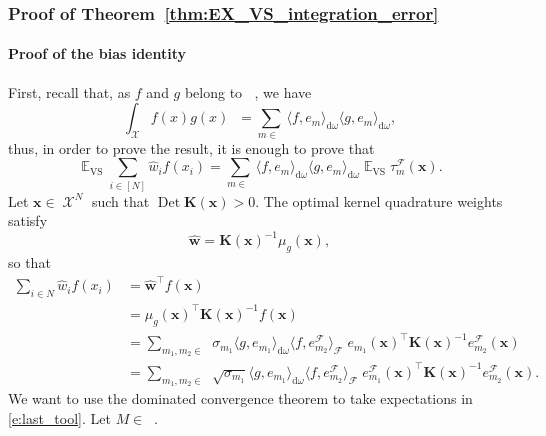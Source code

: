 \documentclass[twoside,11pt]{book}
\numberwithin{theorem}{chapter}
\numberwithin{definition}{chapter}
\numberwithin{proposition}{chapter}
\numberwithin{corollary}{chapter}
\numberwithin{example}{chapter}
\numberwithin{lemma}{chapter}
\DeclareMathOperator{\Det}{Det}
\DeclareMathOperator{\VS}{\mathrm{VS}}
\DeclareMathOperator{\Tran}{\intercal}
\DeclareMathOperator{\EX}{\mathbb{E}}
\DeclareMathOperator{\F}{\mathcal{F}}
\DeclareMathOperator{\X}{\mathcal{X}}
\DeclareMathOperator{\Ltwo}{\mathbb{L}_{2}(\mathrm{d} \omega)}
\DeclareMathOperator{\Mu}{\mathrm{d}\omega(x)}
\DeclareMathOperator{\Ns}{\mathbb{N}^{*}}
\newcommand{\rb}[1]{\textcolor{magenta}{#1}}
\begin{document}
\subsubsection{Proof of Theorem~\ref{thm:EX_VS_integration_error}}\label{app:proof_bias}
\paragraph{Proof of the bias identity}
First, recall that, as $f$ and $g$ belong to $\Ltwo$, we have
\begin{equation}
\int_{\X}f(x)g(x) \Mu = \sum\limits_{m \in \Ns} \langle f,e_{m}\rangle_{\mathrm{d}\omega} \langle g,e_{m}\rangle_{\mathrm{d}\omega},
\end{equation}
thus, in order to prove the result, it is enough to prove that
\begin{equation}\label{eq:EX_VS_optimal_quadrature_formula}
\EX_{\VS} \sum\limits_{i \in [N]} \widehat{w}_{i}f(x_{i}) = \sum\limits_{m \in \Ns} \langle f,e_{m} \rangle_{\mathrm{d}\omega} \langle g,e_{m} \rangle_{\mathrm{d}\omega} \EX_{\VS}\tau_{m}^{\F}(\bm{x}).
\end{equation}
Let $\bm{x} \in \X^{N}$ such that $\Det \bm{K}(\bm{x})>0$. The optimal kernel quadrature weights satisfy
\begin{equation}
\widehat{\bm{w}} = \bm{K}(\bm{x})^{-1}\mu_{g}(\bm{x}),
\end{equation}
so that
\begin{align}
\sum\limits_{i \in N} \widehat{w}_{i}f(x_{i}) & = \widehat{\bm{w}}^{\Tran} f(\bm{x}) \\
& = \mu_{g}(\bm{x})^{\Tran} \bm{K}(\bm{x})^{-1} f(\bm{x})\\
& = \sum_{m_{1},m_{2} \in \Ns} \sigma_{m_{1}} \langle g, e_{m_{1}} \rangle_{\mathrm{d}\omega} \langle f, e_{m_{2}}^{\F} \rangle_{\F} \; e_{m_{1}}(\bm{x})^{\Tran} \bm{K}(\bm{x})^{-1}e_{m_{2}}^{\F}(\bm{x}) \\
& = \sum\limits_{m_{1},m_{2} \in \Ns} \sqrt{\sigma_{m_{1}}} \langle g, e_{m_{1}} \rangle_{\mathrm{d}\omega}  \langle f, e_{m_{2}}^{\F} \rangle_{\F}\;  e_{m_{1}}^{\F}(\bm{x})^{\Tran} \bm{K}(\bm{x})^{-1}e_{m_{2}}^{\F}(\bm{x}).
\label{e:last_tool}
\end{align}
We want to use the dominated convergence theorem to take expectations in \eqref{e:last_tool}.
Let $M \in \Ns$.
\end{document}
